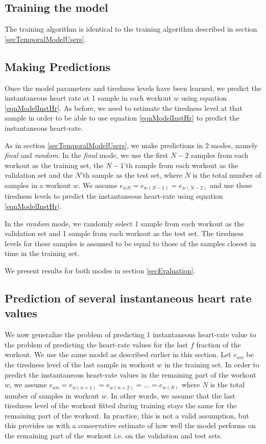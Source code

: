 \documentclass{acm_proc_article-sp}
\begin{document}
\subsection{Training the model}
The training algorithm is identical to the training algorithm described in section \ref{secTemporalModelUsers}.

\subsection{Making Predictions}
Once the model parameters and tiredness levels have been learned, we predict the instantaneous heart rate at 1 sample in each workout $w$ using equation \ref{eqnModelInstHr}. As before, we need to estimate the tiredness level at that sample in order to be able to use equation \ref{eqnModelInstHr} to predict the instantaneous heart-rate. 

As in section \ref{secTemporalModelUsers}, we make predictions in  2 modes, namely \emph{final} and \emph{random}.  In the \emph{final} mode, we use the first $N-2$ samples from each workout as the training set, the $N-1$'th sample from each workout as the validation set and the $N$'th sample as the test set, where $N$ is the total number of samples in a workout $w$. We assume $e_{wN} = e_{w(N-1)} = e_{w(N-2)}$ and use these tiredness levels to predict the instantaneous heart-rate using equation \ref{eqnModelInstHr}.

In the \emph{random} mode, we randomly select 1 sample from each workout as the validation set and 1 sample from each workout as the test set. The tiredness levels for these samples is assumed to be equal to those of the samples closest in time in the training set. 

We present results for both modes in section \ref{secEvaluation}.

\subsection{Prediction of several instantaneous heart rate values}
We now generalize the problem of predicting 1 instantaneous heart-rate value to the problem of predicting the heart-rate values for the last $f$ fraction of the workout. We use the same model as described earlier in this section. Let $e_{wn}$ be the tiredness level of the last sample in workout $w$ in the training set. In order to predict the instantaneous heart-rate values in the remaining part of the workout $w$, we assume $e_{wn} = e_{w(n+1)} = e_{w(n+2)} = ... = e_{w(N)}$ where $N$ is the total number of samples in workout $w$. In other words, we assume that the last tiredness level of the workout fitted during training stays the same for the remaining part of the workout. In practice, this is not a valid assumption, but this provides us with a conservative estimate of how well the model performs on the remaining part of the workout i.e. on the validation and test sets.
\end{document}
